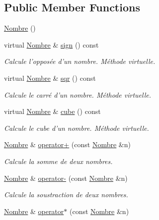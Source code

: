 \subsection*{\-Public \-Member \-Functions}
\begin{DoxyCompactItemize}
\item 
\hyperlink{classNombre_a3c74c643475c2df0e2ecafe93a1e113a}{\-Nombre} ()
\item 
virtual \hyperlink{classNombre}{\-Nombre} \& \hyperlink{classNombre_a3fb106bcd953c9d3e03609bf1d49f2e7}{sign} () const 
\begin{DoxyCompactList}\small\item\em \-Calcule l'opposée d'un nombre. \-Méthode virtuelle. \end{DoxyCompactList}\item 
virtual \hyperlink{classNombre}{\-Nombre} \& \hyperlink{classNombre_a43b5ad781c1274196907939a36ecefcf}{sqr} () const 
\begin{DoxyCompactList}\small\item\em \-Calcule le carré d'un nombre. \-Méthode virtuelle. \end{DoxyCompactList}\item 
virtual \hyperlink{classNombre}{\-Nombre} \& \hyperlink{classNombre_a14b257b875fd98a9d53cf275464957e5}{cube} () const 
\begin{DoxyCompactList}\small\item\em \-Calcule le cube d'un nombre. \-Méthode virtuelle. \end{DoxyCompactList}\item 
\hyperlink{classNombre}{\-Nombre} \& \hyperlink{classNombre_a3e5a5aca1c59ff671feab5639ffed9b0}{operator+} (const \hyperlink{classNombre}{\-Nombre} \&n)
\begin{DoxyCompactList}\small\item\em \-Calcule la somme de deux nombres. \end{DoxyCompactList}\item 
\hyperlink{classNombre}{\-Nombre} \& \hyperlink{classNombre_a4d78f1887b4896ac59cbc66bdd919644}{operator-\/} (const \hyperlink{classNombre}{\-Nombre} \&n)
\begin{DoxyCompactList}\small\item\em \-Calcule la soustraction de deux nombres. \end{DoxyCompactList}\item 
\hyperlink{classNombre}{\-Nombre} \& \hyperlink{classNombre_a8d0fa5c9724a72a81dfb5a50f8698bad}{operator$\ast$} (const \hyperlink{classNombre}{\-Nombre} \&n)

\end{DoxyCompactItemize}
